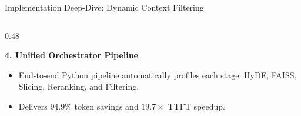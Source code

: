 \documentclass[10pt,aspectratio=169]{beamer}
\begin{document}
\begin{frame}{Implementation Deep-Dive: Dynamic Context Filtering}
\begin{columns}[onlytextwidth,T]
\begin{column}{0.48\textwidth}
            \begin{block}{\textbf{4. Unified Orchestrator Pipeline}}
                \begin{itemize}
                    \item End-to-end Python pipeline automatically profiles each stage: HyDE, FAISS, Slicing, Reranking, and Filtering.
                    \item Delivers $94.9\%$ token savings and $19.7\times$ TTFT speedup.
                \end{itemize}
            \end{block}
        \end{column}
    \end{columns}
\end{frame}

\end{document}
